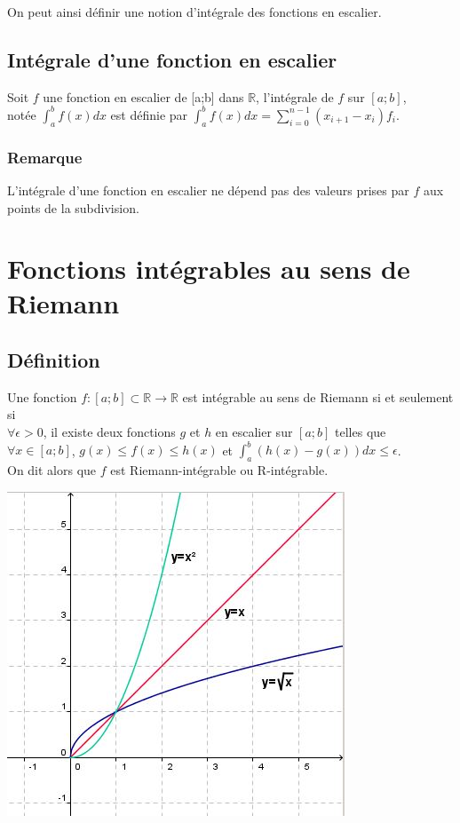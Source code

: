 \documentclass[a4paper,10pt]{book} %
\newcommand{\R}{\mathbb{R}}
\begin{document}
On peut ainsi définir une notion d'intégrale des fonctions en escalier.

\subsection{Intégrale d'une fonction en escalier}
Soit $f$ une fonction en escalier de [a;b] dans $\R$, l'intégrale de $f$ sur $[a;b]$,\\
notée $\displaystyle \int_{a}^{b}f(x)dx$ est définie par $\displaystyle\int_{a}^{b}f(x)dx=\sum\limits_{i=0}^{n-1} (x_{i+1}-x_i)f_i$.

\subsubsection{Remarque}
L'intégrale d'une fonction en escalier ne dépend pas des valeurs prises par $f$ aux points de la subdivision.

\section{Fonctions intégrables au sens de Riemann}
\subsection{Définition}
Une fonction $f: [a;b]\subset \R\rightarrow \R$ est intégrable au sens de Riemann si et seulement si\\
$\forall \epsilon >0$, il existe deux fonctions $g$ et $h$ en escalier sur $[a;b]$ telles que\\
$\forall x\in [a;b]$, $g(x)\leq f(x)\leq h(x)$ et $\displaystyle\int_{a}^{b} (h(x)-g(x))dx\leq \epsilon$.\\

On dit alors que $f$ est Riemann-intégrable ou R-intégrable.

\begin{center} \includegraphics[scale=0.75]{images/002.png} \end{center}
\end{document}

